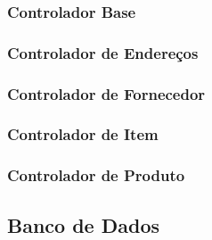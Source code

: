 \subsubsection{Controlador Base}

\subsubsection{Controlador de Endereços}

\subsubsection{Controlador de Fornecedor}

\subsubsection{Controlador de Item}

\subsubsection{Controlador de Produto}


\subsection{Banco de Dados}


